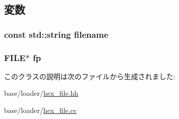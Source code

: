 \subsection{変数}
\hypertarget{classHexFile_a42a21beb8018ac623f4d09db1343b9cf}{
\subsubsection[{filename}]{\setlength{\rightskip}{0pt plus 5cm}const std::string {\bf filename}}}
\label{classHexFile_a42a21beb8018ac623f4d09db1343b9cf}
\hypertarget{classHexFile_aa065f30aa9f5f9a42132c82c787ee70b}{
\subsubsection[{fp}]{\setlength{\rightskip}{0pt plus 5cm}FILE$\ast$ {\bf fp}}}
\label{classHexFile_aa065f30aa9f5f9a42132c82c787ee70b}


このクラスの説明は次のファイルから生成されました:\begin{DoxyCompactItemize}
\item 
base/loader/\hyperlink{hex__file_8hh}{hex\_\-file.hh}\item 
base/loader/\hyperlink{hex__file_8cc}{hex\_\-file.cc}\end{DoxyCompactItemize}
